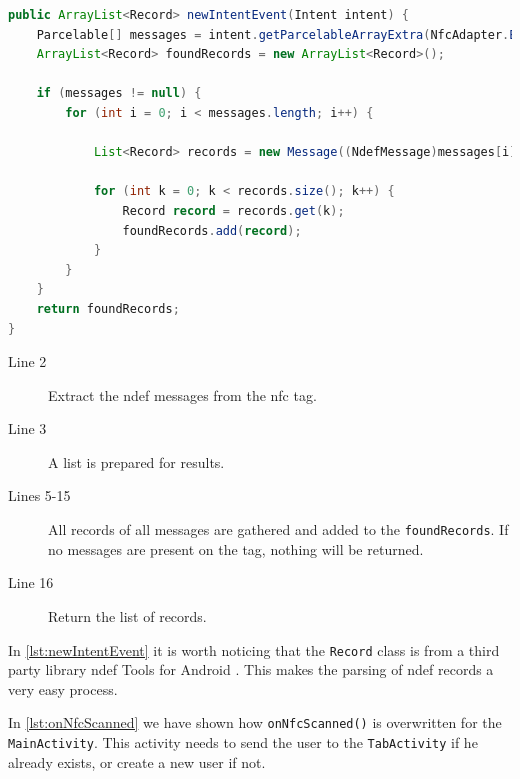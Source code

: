 \begin{lstlisting}[language=java, label=lst:newIntentEvent, caption=\lstinline|newIntentEvent| parsing to records]
public ArrayList<Record> newIntentEvent(Intent intent) {
    Parcelable[] messages = intent.getParcelableArrayExtra(NfcAdapter.EXTRA_NDEF_MESSAGES);
    ArrayList<Record> foundRecords = new ArrayList<Record>();

    if (messages != null) {
        for (int i = 0; i < messages.length; i++) {

            List<Record> records = new Message((NdefMessage)messages[i]);

            for (int k = 0; k < records.size(); k++) {
                Record record = records.get(k);
                foundRecords.add(record);
            }
        }
    }
    return foundRecords;
}
\end{lstlisting}
\begin{description}
\item[Line 2] Extract the \ac{ndef} messages from the \ac{nfc} tag.
\item[Line 3] A list is prepared for results.
\item[Lines 5-15] All records of all messages are gathered and added to the \lstinline|foundRecords|. If no messages are present on the tag, nothing will be returned.
\item[Line 16] Return the list of records.
\end{description}

In \autoref{lst:newIntentEvent} it is worth noticing that the \lstinline|Record| class is from a third party library \ac{ndef} Tools for Android \citep{ndeftools}. This makes the parsing of \ac{ndef} records a very easy process.

In \autoref{lst:onNfcScanned} we have shown how \lstinline|onNfcScanned()| is overwritten for the \lstinline|MainActivity|. This activity needs to send the user to the \lstinline|TabActivity| if he already exists, or create a new user if not.

